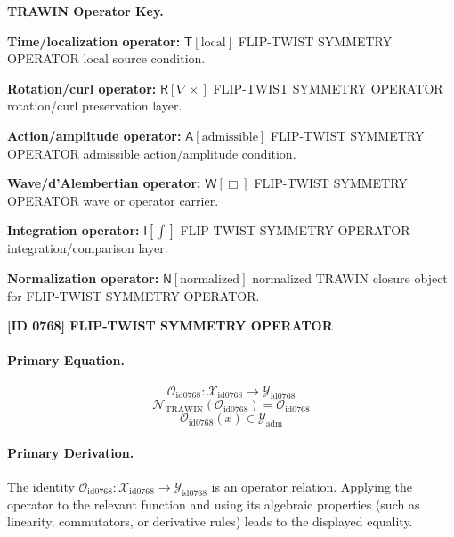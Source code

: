 \par\vspace{0.45\baselineskip}
\noindent\begin{minipage}[t]{\linewidth}
\begingroup
\small
\raggedright
\textbf{TRAWIN Operator Key.}\par
\noindent\textbf{Time/localization operator:} $\mathsf{T}\!\left[\mathrm{local}\right]$ FLIP-TWIST SYMMETRY OPERATOR local source condition.\par
\noindent\textbf{Rotation/curl operator:} $\mathsf{R}\!\left[\nabla\times\right]$ FLIP-TWIST SYMMETRY OPERATOR rotation/curl preservation layer.\par
\noindent\textbf{Action/amplitude operator:} $\mathsf{A}\!\left[\mathrm{admissible}\right]$ FLIP-TWIST SYMMETRY OPERATOR admissible action/amplitude condition.\par
\noindent\textbf{Wave/d'Alembertian operator:} $\mathsf{W}\!\left[\Box\right]$ FLIP-TWIST SYMMETRY OPERATOR wave or operator carrier.\par
\noindent\textbf{Integration operator:} $\mathsf{I}\!\left[\int\right]$ FLIP-TWIST SYMMETRY OPERATOR integration/comparison layer.\par
\noindent\textbf{Normalization operator:} $\mathsf{N}\!\left[\mathrm{normalized}\right]$ normalized TRAWIN closure object for FLIP-TWIST SYMMETRY OPERATOR.\par
\endgroup
\end{minipage}

\clearpage
\noindent\textbf{[ID 0768] FLIP-TWIST SYMMETRY OPERATOR}\par
\vspace{0.35em}
\paragraph{Primary Equation.}
\[
\mathcal{O}_{\mathrm{id0768}}:\mathcal{X}_{\mathrm{id0768}}\longrightarrow\mathcal{Y}_{\mathrm{id0768}}
\]
\[
\mathcal{N}_{\mathrm{TRAWIN}}(\mathcal{O}_{\mathrm{id0768}})=\mathcal{O}_{\mathrm{id0768}}
\]
\[
\mathcal{O}_{\mathrm{id0768}}(x)\in\mathcal{Y}_{\mathrm{adm}}
\]

\paragraph{Primary Derivation.}
The identity \( \mathcal{O}_{\mathrm{id0768}}:\mathcal{X}_{\mathrm{id0768}}\longrightarrow\mathcal{Y}_{\mathrm{id0768}} \) is an operator relation. Applying the operator to the relevant function and using its algebraic properties (such as linearity, commutators, or derivative rules) leads to the displayed equality.
